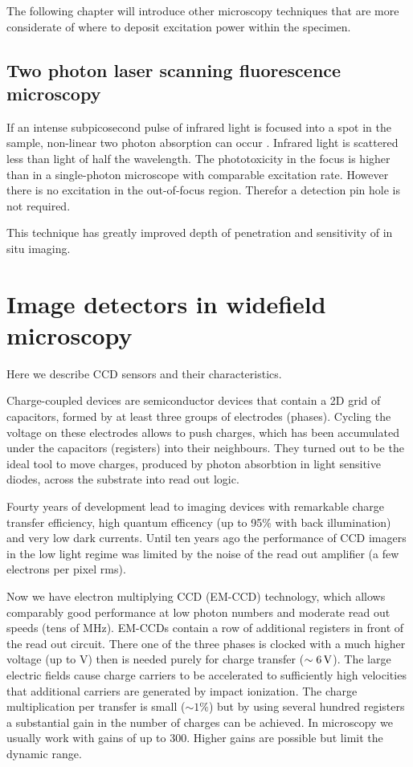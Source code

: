 The following chapter will introduce other microscopy techniques that
are more considerate of where to deposit excitation power within the
specimen.
\subsection{Two photon laser scanning fluorescence microscopy}
If an intense subpicosecond pulse of infrared light is focused into a
spot in the sample, non-linear two photon absorption can occur
\citep{Denk1990}. Infrared light is scattered less than light of half
the wavelength. The phototoxicity in the focus is higher than in a
single-photon microscope with comparable excitation rate. However
there is no excitation in the out-of-focus region. Therefor a
detection pin hole is not required.

This technique has greatly improved depth of penetration and
sensitivity of in situ imaging. %
\section{Image detectors in widefield microscopy}
\label{sec:ccd-intro}
\begin{summary}
  Here we describe CCD
  sensors and their characteristics.
\end{summary}
Charge-coupled devices are semiconductor devices that contain a 2D
grid of capacitors, formed by at least three groups of electrodes
(phases). Cycling the voltage on these electrodes allows to push
charges, which has been accumulated under the capacitors (registers)
into their neighbours. They turned out to be the ideal tool to move
charges, produced by photon absorbtion in light sensitive diodes,
across the substrate into read out logic.

Fourty years of development lead to imaging devices with remarkable
charge transfer efficiency, high quantum efficency (up to 95\% with
back illumination) and very low dark currents. Until ten years ago the
performance of CCD imagers in the low light regime was limited by the
noise of the read out amplifier (a few electrons per pixel rms).

Now we have electron multiplying CCD (EM-CCD)
 technology,
which allows comparably good performance at low photon numbers
\citep{Mackay,Robbins2003} and moderate read out speeds (tens of
MHz). EM-CCDs contain a row of additional registers in front of the
read out circuit. There one of the three phases is clocked with a much
higher voltage (up to \unit[40]{V}) then is needed purely for charge
transfer ($\unit[\sim6]{V}$). The large electric fields cause charge
carriers to be accelerated to sufficiently high velocities that
additional carriers are generated by impact ionization. The charge
multiplication per transfer is small ($\sim1\%$) but by using several
hundred registers a substantial gain in the number of charges can be
achieved. In microscopy we usually work with gains of up to
300. Higher gains are possible but limit the dynamic range.


